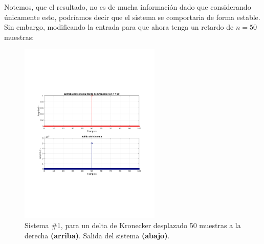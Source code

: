 			Notemos, que el resultado, no es de mucha información dado que considerando únicamente esto, podríamos decir que el sistema se comportaria de forma estable. Sin embargo, modificando la entrada para que ahora tenga un retardo de $n = 50$ muestras:
			\begin{figure}[H]
				\center
				\includegraphics[width=0.6\textwidth,clip, trim = {2cm 7.0cm 2.2cm 7.0cm}]{../imgs/sistema_1_bibo_n_50.pdf}
				\caption{Sistema \#1, para un delta de Kronecker desplazado 50 muestras a la derecha \textbf{(arriba)}. Salida del sistema \textbf{(abajo)}.}
				\label{fig:s_1_bibo_50}
			\end{figure}
			
